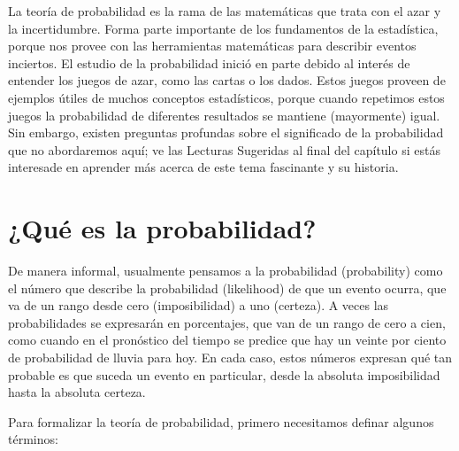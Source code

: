 \documentclass[
  12pt,
]{book}
\begin{document}
La teoría de probabilidad es la rama de las matemáticas que trata con el azar y la incertidumbre. Forma parte importante de los fundamentos de la estadística, porque nos provee con las herramientas matemáticas para describir eventos inciertos. El estudio de la probabilidad inició en parte debido al interés de entender los juegos de azar, como las cartas o los dados. Estos juegos proveen de ejemplos útiles de muchos conceptos estadísticos, porque cuando repetimos estos juegos la probabilidad de diferentes resultados se mantiene (mayormente) igual. Sin embargo, existen preguntas profundas sobre el significado de la probabilidad que no abordaremos aquí; ve las Lecturas Sugeridas al final del capítulo si estás interesade en aprender más acerca de este tema fascinante y su historia.

\hypertarget{quuxe9-es-la-probabilidad}{%
\section{¿Qué es la probabilidad?}\label{quuxe9-es-la-probabilidad}}

De manera informal, usualmente pensamos a la probabilidad (probability) como el número que describe la probabilidad (likelihood) de que un evento ocurra, que va de un rango desde cero (imposibilidad) a uno (certeza). A veces las probabilidades se expresarán en porcentajes, que van de un rango de cero a cien, como cuando en el pronóstico del tiempo se predice que hay un veinte por ciento de probabilidad de lluvia para hoy. En cada caso, estos números expresan qué tan probable es que suceda un evento en particular, desde la absoluta imposibilidad hasta la absoluta certeza.

Para formalizar la teoría de probabilidad, primero necesitamos definar algunos términos:
\end{document}

